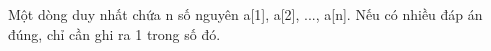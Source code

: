 Một dòng duy nhất chứa n số nguyên a[1], a[2], ..., a[n]. Nếu có nhiều đáp án đúng, chỉ cần ghi ra 1 trong số đó.  

\